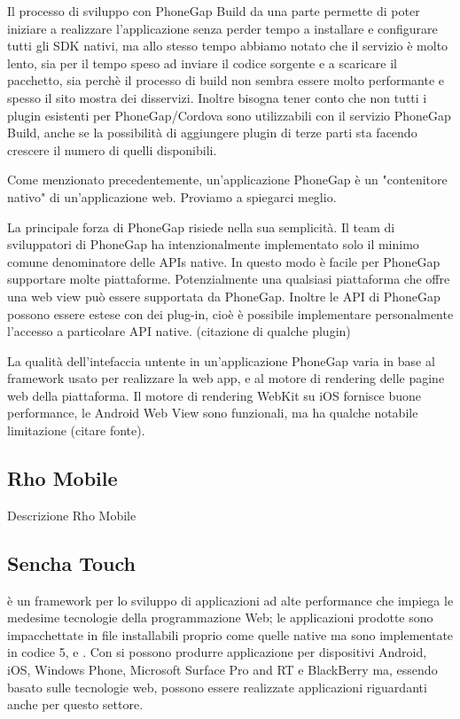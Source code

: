 			Il processo di sviluppo con PhoneGap Build da una parte permette di 
			poter iniziare a realizzare l'applicazione senza perder tempo a 
			installare e configurare tutti gli SDK nativi, ma allo stesso tempo 
			abbiamo notato che il servizio è molto lento, sia per il tempo speso  
			ad inviare il codice sorgente e a scaricare il pacchetto, sia perchè 
			il processo 
			di build non sembra essere molto performante e spesso il sito mostra 
			dei disservizi. Inoltre bisogna tener conto che non tutti i plugin 
			esistenti per PhoneGap/Cordova sono utilizzabili con il servizio 
			PhoneGap Build, anche se la possibilità di aggiungere plugin di terze 
			parti sta facendo crescere il numero di quelli disponibili.
			
			Come menzionato precedentemente, un'applicazione PhoneGap è un 
			"contenitore nativo" di un'applicazione web. Proviamo a spiegarci 
			meglio.
			
			
			La principale forza di PhoneGap risiede nella sua semplicità. 
			Il team di sviluppatori di PhoneGap ha intenzionalmente implementato 
			solo il minimo comune denominatore delle APIs native. In questo modo 
			è facile per PhoneGap supportare molte piattaforme. Potenzialmente 
			una qualsiasi piattaforma che offre una web view può essere supportata 
			da PhoneGap.
			Inoltre le API di PhoneGap possono essere estese con dei plug-in, cioè 
			è possibile implementare personalmente l'accesso a particolare API native.
			(citazione di qualche plugin)
			
			La qualità dell'intefaccia untente in un'applicazione PhoneGap 
			varia in base al framework usato per realizzare la web app, e al 
			motore di rendering delle pagine web della piattaforma.
			Il motore di rendering WebKit su iOS fornisce buone performance, le 
			Android Web View sono funzionali, ma ha qualche notabile limitazione 
			(citare fonte).
			

		\subsection{Rho Mobile}
			Descrizione Rho Mobile

		\subsection{Sencha Touch}
			\senchat{} è un framework per lo sviluppo \crossplat{} di
			applicazioni ad	alte performance che impiega le medesime tecnologie
			della programmazione Web; le applicazioni prodotte sono
			impacchettate in file installabili proprio come quelle native ma
			sono implementate in codice \html{}5, \css{} e \js{}. Con \senchat{}
			si possono produrre applicazione per dispositivi Android, iOS,
			Windows Phone, Microsoft Surface Pro and RT e BlackBerry ma, essendo
			basato sulle tecnologie web, possono essere realizzate applicazioni
			riguardanti anche per questo settore.
			
